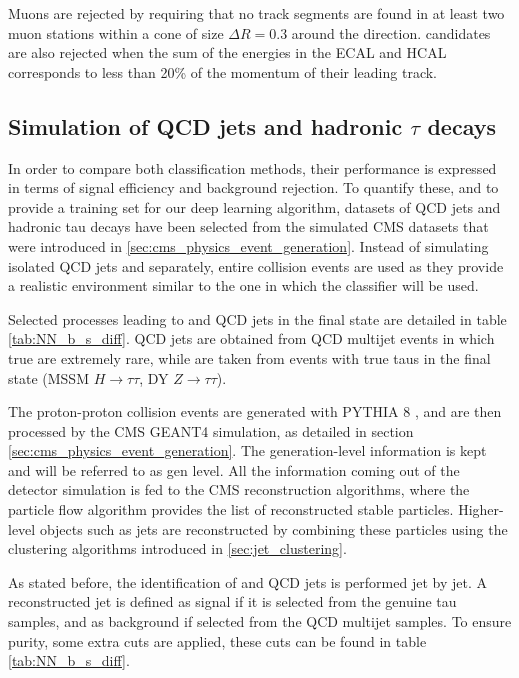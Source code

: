 Muons are rejected by requiring that no track segments are found in at least two muon stations within a cone of size $\Delta R = 0.3$ around the \tauh direction. \tauh candidates are also rejected when the sum of the energies in the ECAL and HCAL corresponds to less than 20\% of the momentum of their leading track.

\subsection{Simulation of QCD jets and hadronic $\tau$ decays}
\label{sec:NN_datasets}

In order to compare both classification methods, their performance is expressed in terms of signal efficiency and background rejection. To quantify these, and to provide a training set for our deep learning algorithm, datasets of QCD jets and hadronic tau decays have been selected from the simulated CMS datasets that were introduced in \ref{sec:cms_physics_event_generation}. Instead of simulating isolated QCD jets and \tauh separately, entire collision events are used as they provide a realistic environment similar to the one in which the classifier will be used.

Selected processes leading to \tauh and QCD jets in the final state are detailed in table \ref{tab:NN_b_s_diff}. QCD jets are obtained from QCD multijet events in which true \tauh are extremely rare, while \tauh are taken from events with true taus in the final state (MSSM $H\rightarrow \tau\tau$, DY $Z\rightarrow \tau\tau$).


The proton-proton collision events are generated with PYTHIA 8 \cite{SJOSTRAND2008852}, and are then processed by the CMS GEANT4 simulation, as detailed in section \ref{sec:cms_physics_event_generation}. The generation-level information is kept and will be referred to as gen level. All the information coming out of the detector simulation is fed to the CMS reconstruction algorithms, where the particle flow algorithm provides the list of reconstructed stable particles. Higher-level objects such as jets are reconstructed by combining these particles using the clustering algorithms introduced in \ref{sec:jet_clustering}.

As stated before, the identification of \tauh and QCD jets is performed jet by jet. A reconstructed jet is defined as signal if it is selected from the genuine tau samples, and as background if selected from the QCD multijet samples. To ensure purity, some extra cuts are applied, these cuts can be found in table \ref{tab:NN_b_s_diff}.

